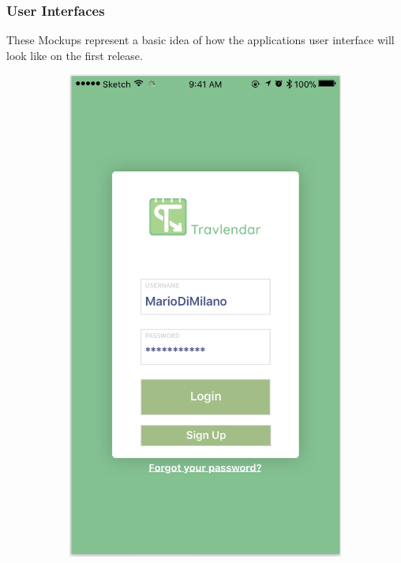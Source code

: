 \documentclass[12pt]{article}
\begin{document}
\subsubsection{User Interfaces}
These Mockups represent a basic idea of how the applications user interface will look like on the first release.

\begin{figure}[H]
\centering
    \begin{subfigure}{.4\textwidth}
        \includegraphics[scale=0.47]{interfaceLogin.png}

\end{subfigure}
\end{figure}
\end{document}
